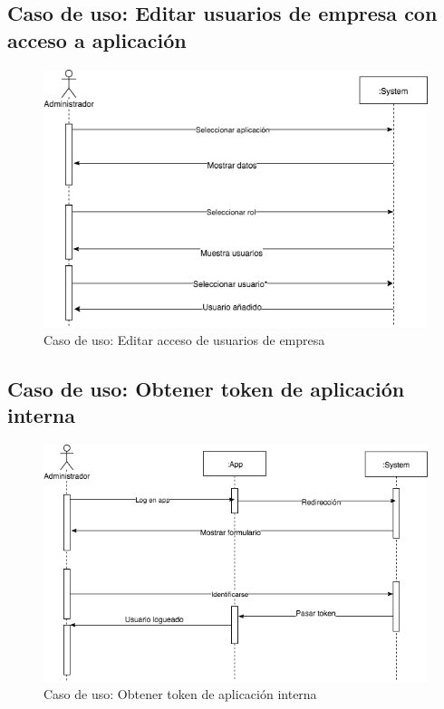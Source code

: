 \documentclass[12pt,a4paperpaper,]{report}
\begin{document}
\subsection{Caso de uso: Editar usuarios de empresa con acceso a
aplicación}\label{caso-de-uso-editar-usuarios-de-empresa-con-acceso-a-aplicaciuxf3n}

\begin{figure}
\centering
\includegraphics{source/figures/secuencia-editar-usuarios-empresa-aplicacion.png}
\caption{Caso de uso: Editar acceso de usuarios de empresa
\label{secuencia_editar_usuarios_empresa_aplicacion}}
\end{figure}

\subsection{Caso de uso: Obtener token de aplicación
interna}\label{caso-de-uso-obtener-token-de-aplicaciuxf3n-interna}

\begin{figure}
\centering
\includegraphics{source/figures/secuencia-obtener-token.png}
\caption{Caso de uso: Obtener token de aplicación interna
\label{secuencia_obtener_token}}
\end{figure}
\end{document}
